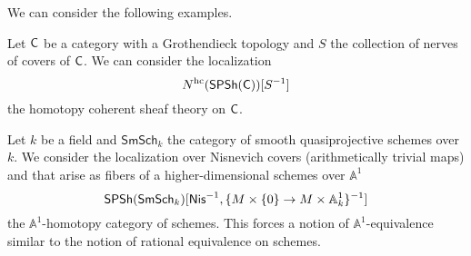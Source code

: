 We can consider the following examples. 
\begin{example}
    Let $\mathsf{C}$ be a category with a Grothendieck topology and $S$ the collection of nerves of covers of $\mathsf{C}$. We can consider the localization 
    $$N^{\mathrm{hc}}(\mathsf{SPSh}(\mathsf{C}))[S^{-1}]$$
    the homotopy coherent sheaf theory on $\mathsf{C}$. 
\end{example}
\begin{example}
    Let $k$ be a field and $\mathsf{SmSch}_{k}$ the category of smooth quasiprojective schemes over $k$. We consider the localization over Nisnevich covers (arithmetically trivial maps) and that arise as fibers of a higher-dimensional schemes over $\mathbb{A}^{1}$
    $$\mathsf{SPSh}(\mathsf{SmSch}_{k})[\mathsf{Nis}^{-1}, \{M\times\{0\}\to M\times\mathbb{A}^{1}_{k}\}^{-1}]$$
    the $\mathbb{A}^{1}$-homotopy category of schemes. This forces a notion of $\mathbb{A}^{1}$-equivalence similar to the notion of rational equivalence on schemes. 
\end{example}